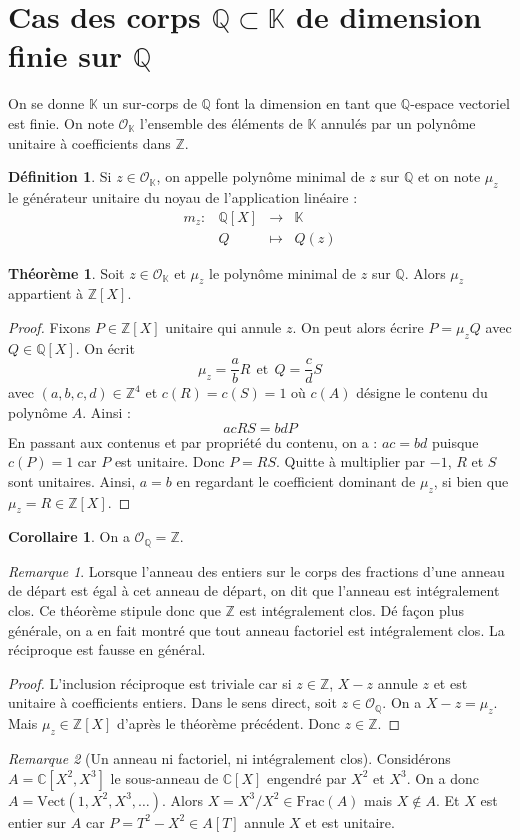 \documentclass[french]{article}
\newcommand{\Z}{\mathbb{Z}}
\newcommand{\Q}{\mathbb{Q}}
\newcommand{\C}{\mathbb{C}}
\newcommand{\K}{\mathbb{K}}
\theoremstyle{definition}
\newtheorem{dfn}{Définition}
\theoremstyle{theorem}
\newtheorem{thm}{Théorème}
\newtheorem{cor}{Corollaire}
\theoremstyle{remark}
\newtheorem*{rmq}{Remarque}
\begin{document}
\section{Cas des corps $\Q\subset\K$ de dimension finie sur $\Q$}
On se donne $\K$ un sur-corps de $\Q$ font la dimension en tant que $\Q$-espace vectoriel est finie. On note $\mathcal{O}_\K$ l'ensemble des éléments de $\K$ annulés par un polynôme unitaire à coefficients dans $\Z$.
\begin{dfn}
	Si $z\in\mathcal{O}_\K$, on appelle polynôme minimal de $z$ sur $\Q$ et on note $\mu_z$ le générateur unitaire du noyau de l'application linéaire : $$\begin{array}{lrcl}
		m_z:&\Q[X]&\longrightarrow&\K \\
		&Q&\longmapsto&Q(z)
	\end{array}$$
\end{dfn}
\begin{thm}
	Soit $z\in\mathcal{O}_\K$ et $\mu_z$ le polynôme minimal de $z$ sur $\Q$. Alors $\mu_z$ appartient à $\Z[X]$.
\end{thm}
\begin{proof}
	Fixons $P\in\Z[X]$ unitaire qui annule $z$. On peut alors écrire $P=\mu_z Q$ avec $Q\in\Q[X]$. On écrit $$\mu_z=\frac{a}{b}R\ \ \text{et}\ \ Q=\frac{c}{d}S$$ avec $(a,b,c,d)\in\Z^4$ et $c(R)=c(S)=1$ où $c(A)$ désigne le contenu du polynôme $A$. Ainsi : $$acRS=bdP$$ En passant aux contenus et par propriété du contenu, on a : $ac=bd$ puisque $c(P)=1$ car $P$ est unitaire. Donc $P=RS$. Quitte à multiplier par $-1$, $R$ et $S$ sont unitaires. Ainsi, $a=b$ en regardant le coefficient dominant de $\mu_z$, si bien que $\mu_z=R\in\Z[X]$.
\end{proof}
\begin{cor}
	On a $\mathcal{O}_\Q=\Z$.
\end{cor}
\begin{rmq}
	Lorsque l'anneau des entiers sur le corps des fractions d'une anneau de départ est égal à cet anneau de départ, on dit que l'anneau est intégralement clos. Ce théorème stipule donc que $\Z$ est intégralement clos. Dé façon plus générale, on a en fait montré que tout anneau factoriel est intégralement clos. La réciproque est fausse en général.
\end{rmq}
\begin{proof}
	L'inclusion réciproque est triviale car si $z\in\Z$, $X-z$ annule $z$ et est unitaire à coefficients entiers. Dans le sens direct, soit $z\in\mathcal{O}_\Q$. On a $X-z=\mu_z$. Mais $\mu_z\in\Z[X]$ d'après le théorème précédent.  Donc $z\in\Z$.
\end{proof}
\begin{rmq}[Un anneau ni factoriel, ni intégralement clos]
	Considérons $A=\C[X^2,X^3]$ le sous-anneau de $\C[X]$ engendré par $X^2$ et $X^3$. On a donc $A=\text{Vect}(1,X^2,X^3,\ldots)$. Alors $X=X^3/X^2\in\text{Frac}(A)$ mais $X\notin A$. Et $X$ est entier sur $A$ car $P=T^2-X^2\in A[T]$ annule $X$ et est unitaire.
\end{rmq}
\end{document}
